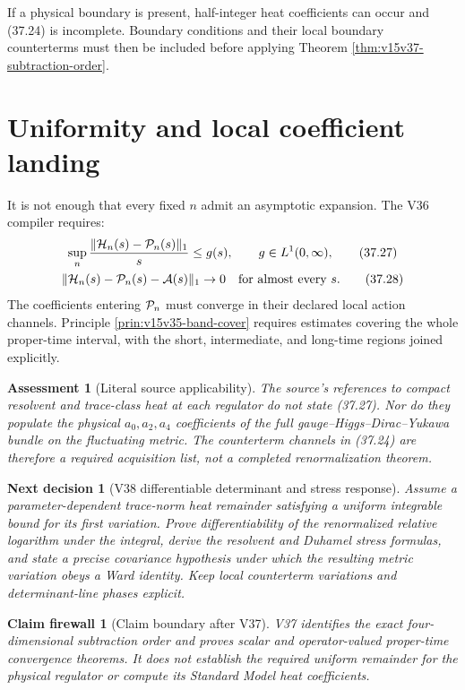 \documentclass[11pt]{article}
\newtheorem{firewall}[theorem]{Claim firewall}
\newtheorem{decision}[theorem]{Next decision}
\newtheorem{assessment}[theorem]{Assessment}
\theoremstyle{remark}
\begin{document}
If a physical boundary is present, half-integer heat coefficients
can occur and (37.24) is incomplete.  Boundary conditions and their
local boundary counterterms must then be included before applying
Theorem \ref{thm:v15v37-subtraction-order}.

\section{Uniformity and local coefficient landing}

It is not enough that every fixed \(n\) admit an asymptotic
expansion.  The V36 compiler requires:
\[
\begin{gathered}
\sup_n\frac{\|{\cal H}_n(s)-{\cal P}_n(s)\|_1}{s}
\leq g(s),\qquad g\in L^1(0,\infty),                    \tag{37.27}\\
\|{\cal H}_n(s)-{\cal P}_n(s)-{\cal A}(s)\|_1\to0
\quad\text{for almost every }s.                         \tag{37.28}
\end{gathered}
\]
The coefficients entering \({\cal P}_n\) must converge in their
declared local action channels.  Principle
\ref{prin:v15v35-band-cover} requires estimates covering the whole
proper-time interval, with the short, intermediate, and long-time
regions joined explicitly.

\begin{assessment}[Literal source applicability]
\label{ass:v15v37-source}
The source's references to compact resolvent and trace-class heat at
each regulator do not state (37.27).  Nor do they populate the
physical \(a_0,a_2,a_4\) coefficients of the full
gauge--Higgs--Dirac--Yukawa bundle on the fluctuating metric.  The
counterterm channels in (37.24) are therefore a required acquisition
list, not a completed renormalization theorem.
\end{assessment}

\begin{decision}[V38 differentiable determinant and stress response]
\label{dec:v15v37-next}
Assume a parameter-dependent trace-norm heat remainder satisfying a
uniform integrable bound for its first variation.  Prove
differentiability of the renormalized relative logarithm under the
integral, derive the resolvent and Duhamel stress formulas, and state
a precise covariance hypothesis under which the resulting metric
variation obeys a Ward identity.  Keep local counterterm variations
and determinant-line phases explicit.
\end{decision}

\begin{firewall}[Claim boundary after V37]
\label{fire:v15v37}
V37 identifies the exact four-dimensional subtraction order and
proves scalar and operator-valued proper-time convergence theorems.
It does not establish the required uniform remainder for the
physical regulator or compute its Standard Model heat
coefficients.
\end{firewall}
\end{document}
